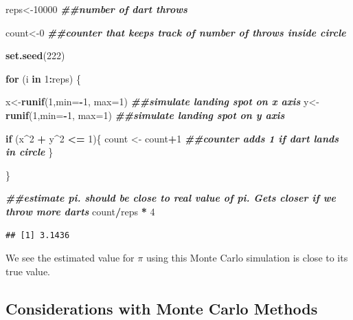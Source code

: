 \documentclass[
]{book}
\newenvironment{Shaded}{\begin{snugshade}}{\end{snugshade}}
\newcommand{\AttributeTok}[1]{\textcolor[rgb]{0.13,0.29,0.53}{#1}}
\newcommand{\ControlFlowTok}[1]{\textcolor[rgb]{0.13,0.29,0.53}{\textbf{#1}}}
\newcommand{\DecValTok}[1]{\textcolor[rgb]{0.00,0.00,0.81}{#1}}
\newcommand{\DocumentationTok}[1]{\textcolor[rgb]{0.56,0.35,0.01}{\textbf{\textit{#1}}}}
\newcommand{\FunctionTok}[1]{\textcolor[rgb]{0.13,0.29,0.53}{\textbf{#1}}}
\newcommand{\NormalTok}[1]{#1}
\newcommand{\OtherTok}[1]{\textcolor[rgb]{0.56,0.35,0.01}{#1}}
\newcommand{\SpecialCharTok}[1]{\textcolor[rgb]{0.81,0.36,0.00}{\textbf{#1}}}
\begin{document}
\begin{Shaded}
\begin{Highlighting}[]
\NormalTok{reps}\OtherTok{\textless{}{-}}\DecValTok{10000} \DocumentationTok{\#\#number of dart throws}

\NormalTok{count}\OtherTok{\textless{}{-}}\DecValTok{0} \DocumentationTok{\#\#counter that keeps track of number of throws inside circle}

\FunctionTok{set.seed}\NormalTok{(}\DecValTok{222}\NormalTok{)}

\ControlFlowTok{for}\NormalTok{ (i }\ControlFlowTok{in} \DecValTok{1}\SpecialCharTok{:}\NormalTok{reps) \{}

\NormalTok{x}\OtherTok{\textless{}{-}}\FunctionTok{runif}\NormalTok{(}\DecValTok{1}\NormalTok{,}\AttributeTok{min=}\SpecialCharTok{{-}}\DecValTok{1}\NormalTok{, }\AttributeTok{max=}\DecValTok{1}\NormalTok{) }\DocumentationTok{\#\#simulate landing spot on x axis}
\NormalTok{y}\OtherTok{\textless{}{-}}\FunctionTok{runif}\NormalTok{(}\DecValTok{1}\NormalTok{,}\AttributeTok{min=}\SpecialCharTok{{-}}\DecValTok{1}\NormalTok{, }\AttributeTok{max=}\DecValTok{1}\NormalTok{) }\DocumentationTok{\#\#simulate landing spot on y axis}

  \ControlFlowTok{if}\NormalTok{ (x}\SpecialCharTok{\^{}}\DecValTok{2} \SpecialCharTok{+}\NormalTok{ y}\SpecialCharTok{\^{}}\DecValTok{2} \SpecialCharTok{\textless{}=} \DecValTok{1}\NormalTok{)\{}
\NormalTok{    count }\OtherTok{\textless{}{-}}\NormalTok{ count}\SpecialCharTok{+}\DecValTok{1} \DocumentationTok{\#\#counter adds 1 if dart lands in circle}
\NormalTok{  \}}

\NormalTok{\}}

\DocumentationTok{\#\#estimate pi. should be close to real value of pi. Gets closer if we throw more darts}
\NormalTok{count}\SpecialCharTok{/}\NormalTok{reps }\SpecialCharTok{*} \DecValTok{4} 
\end{Highlighting}
\end{Shaded}

\begin{verbatim}
## [1] 3.1436
\end{verbatim}

We see the estimated value for \(\pi\) using this Monte Carlo simulation is close to its true value.

\hypertarget{considerations-with-monte-carlo-methods}{%
\subsection{Considerations with Monte Carlo Methods}\label{considerations-with-monte-carlo-methods}}
\end{document}
